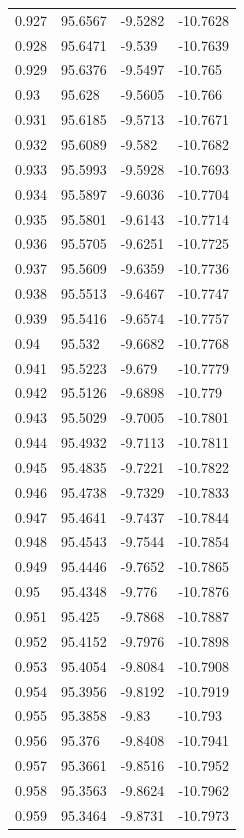 \begin{tabular}{llll}
0.927 & 95.6567 & -9.5282 & -10.7628 \\
0.928 & 95.6471 & -9.539 & -10.7639 \\
0.929 & 95.6376 & -9.5497 & -10.765 \\
0.93 & 95.628 & -9.5605 & -10.766 \\
0.931 & 95.6185 & -9.5713 & -10.7671 \\
0.932 & 95.6089 & -9.582 & -10.7682 \\
0.933 & 95.5993 & -9.5928 & -10.7693 \\
0.934 & 95.5897 & -9.6036 & -10.7704 \\
0.935 & 95.5801 & -9.6143 & -10.7714 \\
0.936 & 95.5705 & -9.6251 & -10.7725 \\
0.937 & 95.5609 & -9.6359 & -10.7736 \\
0.938 & 95.5513 & -9.6467 & -10.7747 \\
0.939 & 95.5416 & -9.6574 & -10.7757 \\
0.94 & 95.532 & -9.6682 & -10.7768 \\
0.941 & 95.5223 & -9.679 & -10.7779 \\
0.942 & 95.5126 & -9.6898 & -10.779 \\
0.943 & 95.5029 & -9.7005 & -10.7801 \\
0.944 & 95.4932 & -9.7113 & -10.7811 \\
0.945 & 95.4835 & -9.7221 & -10.7822 \\
0.946 & 95.4738 & -9.7329 & -10.7833 \\
0.947 & 95.4641 & -9.7437 & -10.7844 \\
0.948 & 95.4543 & -9.7544 & -10.7854 \\
0.949 & 95.4446 & -9.7652 & -10.7865 \\
0.95 & 95.4348 & -9.776 & -10.7876 \\
0.951 & 95.425 & -9.7868 & -10.7887 \\
0.952 & 95.4152 & -9.7976 & -10.7898 \\
0.953 & 95.4054 & -9.8084 & -10.7908 \\
0.954 & 95.3956 & -9.8192 & -10.7919 \\
0.955 & 95.3858 & -9.83 & -10.793 \\
0.956 & 95.376 & -9.8408 & -10.7941 \\
0.957 & 95.3661 & -9.8516 & -10.7952 \\
0.958 & 95.3563 & -9.8624 & -10.7962 \\
0.959 & 95.3464 & -9.8731 & -10.7973 \\

\end{tabular}
